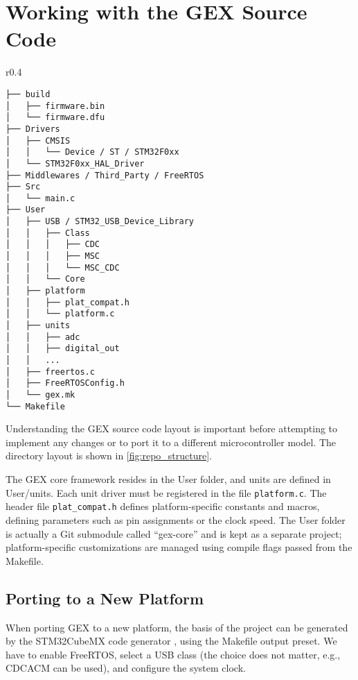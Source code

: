\chapter{Working with the GEX Source Code}

\begin{wrapfigure}[20]{r}{0.4\textwidth}
	\scriptsize\vspace{-3em}
	\begin{verbatim}
├── build
│   ├── firmware.bin
│   └── firmware.dfu
├── Drivers
│   ├── CMSIS
│   │   └── Device / ST / STM32F0xx
│   └── STM32F0xx_HAL_Driver
├── Middlewares / Third_Party / FreeRTOS
├── Src
│   └── main.c
├── User
│   ├── USB / STM32_USB_Device_Library
│   │   ├── Class
│   │   │   ├── CDC
│   │   │   ├── MSC
│   │   │   └── MSC_CDC
│   │   └── Core
│   ├── platform
│   │   ├── plat_compat.h
│   │   └── platform.c
│   ├── units
│   │   ├── adc
│   │   ├── digital_out
│   │   ...
│   ├── freertos.c
│   ├── FreeRTOSConfig.h
│   └── gex.mk
└── Makefile
	\end{verbatim}
	\vspace{-1em}
	\caption{\label{fig:repo_structure} General structure of the source code repository}
\end{wrapfigure}

Understanding the GEX source code layout is important before attempting to implement any changes or to port it to a different microcontroller model. The directory layout is shown in \cref{fig:repo_structure}. 

The GEX core framework resides in the User folder, and units are defined in User/units. Each unit driver must be registered in the file \verb|platform.c|. The header file \verb|plat_compat.h| defines platform-specific constants and macros, defining parameters such as pin assignments or the clock speed. The User folder is actually a Git submodule called ``gex-core'' and is kept as a separate project; platform-specific customizations are managed using compile flags passed from the Makefile.

\section{Porting to a New Platform}

When porting GEX to a new platform, the basis of the project can be generated by the STM32CubeMX code generator \cite{cubemx}, using the Makefile output preset. We have to enable FreeRTOS, select a USB class (the choice does not matter, e.g., \gls{CDCACM} can be used), and configure the system clock. 


